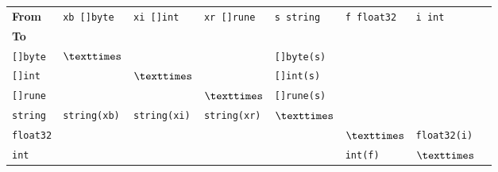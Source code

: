 \begin{tabular}{llllllll}
    \textbf{From}	 &  \verb|xb []byte|& \verb|xi []int| & \verb|xr []rune| & \verb|s string|     & \verb|f float32|	&  \verb|i int|	\\ \cmidrule(r){1-7}
      \textbf{To}	 &		    &                 &   &			   &			& \\ \cmidrule(r){1-1}
  \verb|[]byte|    & $\texttimes$	    &                 &   & \verb|[]byte(s)|	   &			& \\
  \verb|[]int|     &		    & $\texttimes$            &   & \verb|[]int(s)|	   &			& \\
  \verb|[]rune|    &                &                         & $\texttimes$  &  \verb|[]rune(s)| &                    & \\
  \verb|string|    &\verb|string(xb)| &\verb|string(xi)|      &  \verb|string(xr)| &	$\texttimes$	   &			& \\
 \verb|float32|	 &		    &                         &   &			   & $\texttimes$	& \verb|float32(i)|\\
     \verb|int|	 &		    &                         &   &			   & \verb|int(f)|	& $\texttimes$ \\
\end{tabular}
